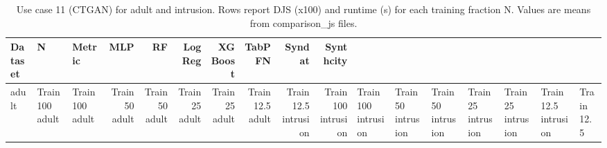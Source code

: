 \begin{table}[ht]
\centering
\scriptsize
\setlength{\tabcolsep}{2.5pt}
\caption{Use case 11 (CTGAN) for adult and intrusion. Rows report DJS (x100) and runtime (s) for each training fraction N. Values are means from comparison_js files.}
\label{tab:uc11_ctgan_adult_intrusion_with_n}
\begin{tabular}{lllrrrrrrr}
\toprule
Dataset & N & Metric & MLP & RF & LogReg & XGBoost & TabPFN & Syndat & Synthcity \\
\midrule
adult & Train 100%
adult & Train 100%
adult & Train 50%
adult & Train 50%
adult & Train 25%
adult & Train 25%
adult & Train 12.5%
adult & Train 12.5%
intrusion & Train 100%
intrusion & Train 100%
intrusion & Train 50%
intrusion & Train 50%
intrusion & Train 25%
intrusion & Train 25%
intrusion & Train 12.5%
intrusion & Train 12.5%
\bottomrule
\end{tabular}
\end{table}